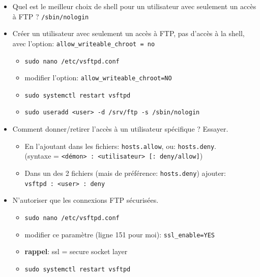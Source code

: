 \documentclass[a4paper]{article}
\begin{document}
\begin{itemize}

\item Quel est le meilleur choix de shell pour un utilisateur avec seulement un accès à FTP ? \texttt{/sbin/nologin}

\item Créer un utilisateur avec seulement un accès à FTP, pas d'accès à la shell, avec l'option: \texttt{allow\_writeable\_chroot = no}
\begin{example}
    \begin{itemize}
        \item \texttt{sudo nano /etc/vsftpd.conf}
        \item modifier l'option: \texttt{allow\_writeable\_chroot=NO}
        \item \texttt{sudo systemctl restart vsftpd}
        \item \texttt{sudo useradd <user> -d /srv/ftp -s /sbin/nologin}
    \end{itemize}
\end{example}

\item Comment donner/retirer l'accès à un utilisateur spécifique ? Essayer.
\begin{example}
    \begin{itemize}
        \item En l'ajoutant dans les fichiers: \texttt{hosts.allow}, ou: \texttt{hosts.deny}. \\
        (syntaxe = \texttt{<démon> : <utilisateur> [: deny/allow]})
        \item Dans un des 2 fichiers (mais de préférence: \texttt{hosts.deny}) ajouter: \\
        \texttt{vsftpd : <user> : deny}
    \end{itemize}
\end{example}

\item N'autoriser que les connexions FTP sécurisées.
\begin{example}
    \begin{itemize}
        \item \texttt{sudo nano /etc/vsftpd.conf}
        \item modifier ce paramètre (ligne 151 pour moi): \texttt{ssl\_enable=YES}
        \item \textbf{rappel}: ssl = secure socket layer
        \item \texttt{sudo systemctl restart vsftpd}
    \end{itemize}
\end{example}

\end{itemize}
\end{document}
